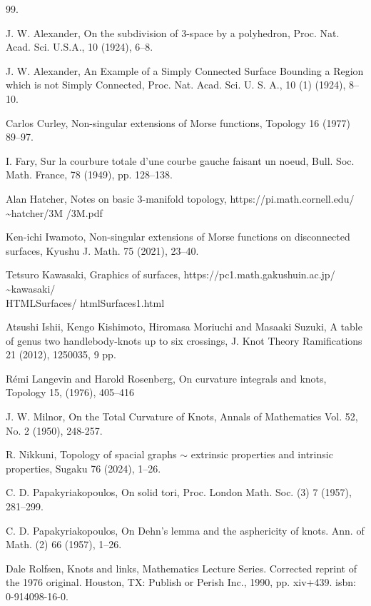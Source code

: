 \documentclass{amsart}
\numberwithin{equation}{section}
\begin{document}
\begin{thebibliography}{99.}%

J. W. Alexander, On the subdivision of 3-space by a polyhedron, Proc. Nat. Acad. Sci. U.S.A., 10 (1924), 6--8.

 J. W.  Alexander,  An Example of a Simply Connected Surface Bounding a Region which is not Simply Connected, Proc. Nat. Acad.  Sci. U. S. A., 10 (1) (1924), 8--10. 

 Carlos Curley, Non-singular extensions of Morse functions, Topology 16 (1977) 89--97.

I. Fary, Sur la courbure totale d'une courbe gauche faisant un noeud,
Bull. Soc. Math. France, 78 (1949), pp. 128--138.

Alan Hatcher, Notes on basic 3-manifold topology, https://pi.math.cornell.edu/ \textasciitilde hatcher/3M /3M.pdf

Ken-ichi Iwamoto, Non-singular extensions of Morse functions on disconnected surfaces, Kyushu J. Math. 75 (2021), 23--40.

 Tetsuro Kawasaki, Graphics of surfaces, 
https://pc1.math.gakushuin.ac.jp/ \textasciitilde kawasaki/ \\HTMLSurfaces/ htmlSurfaces1.html

Atsushi Ishii, Kengo Kishimoto, Hiromasa Moriuchi and Masaaki Suzuki,
A table of genus two handlebody-knots up to six crossings,
J. Knot Theory Ramifications 21 (2012), 1250035, 9 pp.

Rémi Langevin and Harold Rosenberg,
On curvature integrals and knots, 
Topology 15, (1976), 405--416


J. W. Milnor, On the Total Curvature of Knots, 
Annals of Mathematics Vol. 52, No. 2 (1950), 248-257.

R. Nikkuni, Topology of spacial graphs $\sim$ extrinsic properties and intrinsic properties, Sugaku 76 (2024), 1--26.


C. D. Papakyriakopoulos, On solid tori, Proc. London Math. Soc. (3) 7 (1957), 281--299. 

C. D. Papakyriakopoulos, On Dehn's lemma and the asphericity of knots. Ann. of Math. (2) 66 (1957), 1--26. 

Dale Rolfsen, Knots and links, Mathematics Lecture Series. Corrected reprint of the 1976 original. Houston, TX: Publish or Perish Inc., 1990, pp. xiv+439. isbn: 0-914098-16-0.


\end{thebibliography}
\end{document}
